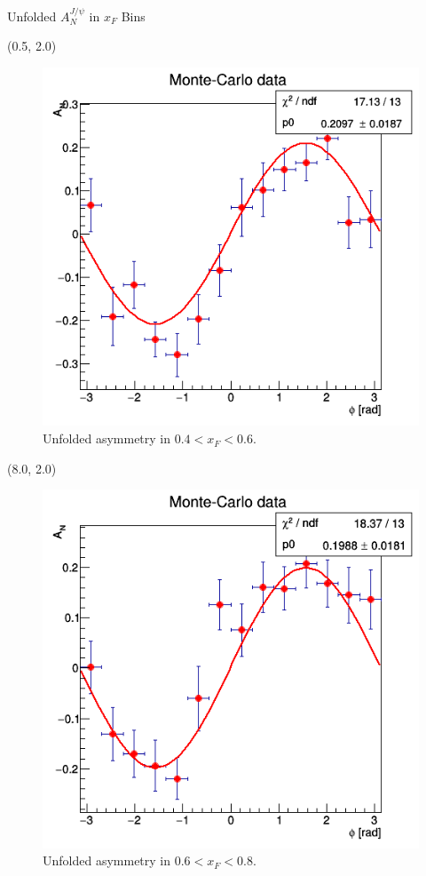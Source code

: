\documentclass[11pt, xcolor={dvipsnames}, aspectratio = 169]{beamer}
\begin{document}
\begin{frame}{Unfolded $A^{J/\psi}_{N}$ in $x_{F}$ Bins}

\begin{textblock}{7.0}(0.5, 2.0)
\begin{figure}
    \centering
    \includegraphics[width = 1.0\linewidth]{imgs/sigal_asym_xf0.png}
    \caption{Unfolded asymmetry in $0.4 < x_{F} < 0.6$.}
\end{figure}
\end{textblock}

\begin{textblock}{7.0}(8.0, 2.0)
\begin{figure}
    \centering
    \includegraphics[width = 1.0\linewidth]{imgs/sigal_asym_xf1.png}
    \caption{Unfolded asymmetry in $0.6 < x_{F} < 0.8$.}
\end{figure}
\end{textblock}

\end{frame}
\end{document}
